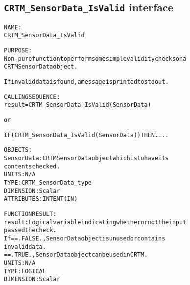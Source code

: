 \subsection{\texttt{CRTM\_SensorData\_IsValid} interface}
  \label{sec:CRTM_SensorData_IsValid_interface}
  \begin{alltt}
 
  NAME:
        CRTM_SensorData_IsValid
 
  PURPOSE:
        Non-pure function to perform some simple validity checks on a
        CRTM SensorData object. 
 
        If invalid data is found, a message is printed to stdout.
 
  CALLING SEQUENCE:
        result = CRTM_SensorData_IsValid( SensorData )
 
          or
 
        IF ( CRTM_SensorData_IsValid( SensorData ) ) THEN....
 
  OBJECTS:
        SensorData:    CRTM SensorData object which is to have its
                       contents checked.
                       UNITS:      N/A
                       TYPE:       CRTM_SensorData_type
                       DIMENSION:  Scalar
                       ATTRIBUTES: INTENT(IN)
 
  FUNCTION RESULT:
        result:        Logical variable indicating whether or not the input
                       passed the check.
                       If == .FALSE., SensorData object is unused or contains
                                      invalid data.
                          == .TRUE.,  SensorData object can be used in CRTM.
                       UNITS:      N/A
                       TYPE:       LOGICAL
                       DIMENSION:  Scalar
 
  \end{alltt}
